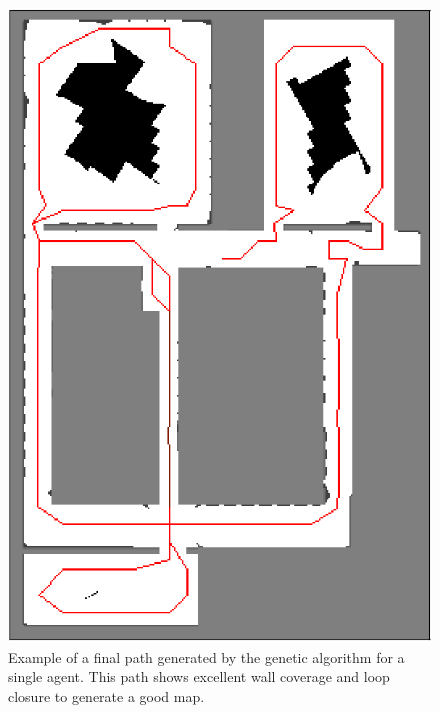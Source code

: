 \documentclass[letterpaper, 10 pt, conference]{ieeeconf}  %
\begin{document}
\begin{figure}
\centering
\includegraphics[width=1.0\linewidth]{figures/single_agent_path.png}
\caption{Example of a final path generated by the genetic algorithm for a single agent. This path shows excellent wall coverage and loop closure to generate a good map.}
\label{fig:final_paths}

\end{figure}
\end{document}
